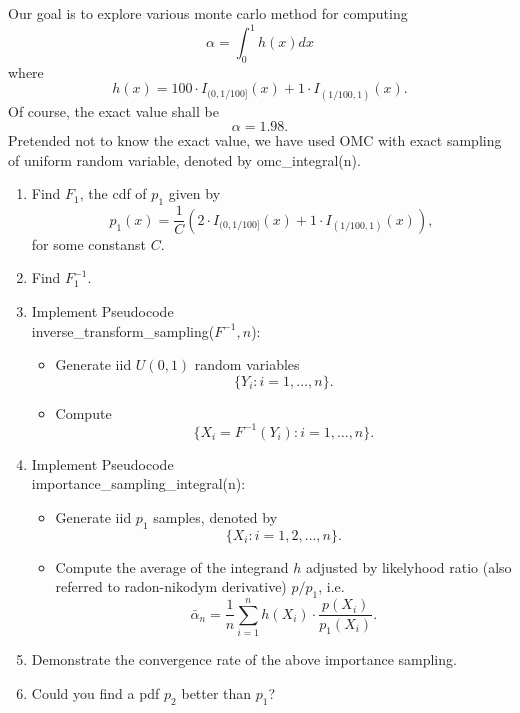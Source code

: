 \documentclass{article}
\begin{document}
Our goal is to explore various monte carlo method for computing
$$\alpha = \int_0^1 h(x) dx$$
where
$$h(x) = 100 \cdot I_{(0, 1/100]}(x) + 1\cdot I_{(1/100, 1)} (x).$$
Of course, the exact value shall be 
$$\alpha = 1.98.$$
Pretended not to know the exact value, we have used OMC with exact sampling of uniform random variable, denoted by omc\_integral(n). 

\begin{enumerate}
 \item Find $F_{1}$, the cdf of $p_{1}$ given by
 $$p_{1} (x) = \frac{1}{C} (2 \cdot I_{(0, 1/100]} (x) + 1 \cdot I_{(1/100, 1)}(x)),$$ for some constanst $C$.
 \item Find $F_{1}^{-1}$.
 \item Implement Pseudocode 
\\inverse\_transform\_sampling($F^{-1}, n$):
\begin{itemize}
 \item Generate iid $U(0,1)$ random variables
 $$\{Y_{i}: i = 1, \ldots, n\}.$$
 \item Compute
 $$\{X_{i} = F^{-1}(Y_{i}): i = 1, \ldots, n\}.$$
\end{itemize}

 \item Implement 
Pseudocode 
\\importance\_sampling\_integral(n): 
\begin{itemize}
 \item Generate iid $p_{1}$ samples, denoted by
 $$\{X_{i}: i = 1, 2, \ldots, n\}.$$
 \item Compute the average of the integrand $h$ adjusted by 
 likelyhood ratio (also referred to radon-nikodym derivative) $p/p_{1}$, i.e.
 $$\bar \alpha_{n} = \frac 1 n \sum_{i=1}^{n} h(X_{i}) \cdot 
 \frac{p(X_{i})}{p_{1}(X_{i})}.$$
\end{itemize}

 \item Demonstrate the convergence rate of the above importance sampling.
 \item Could you find a pdf $p_{2}$ better than $p_{1}$?
\end{enumerate}
\end{document}
